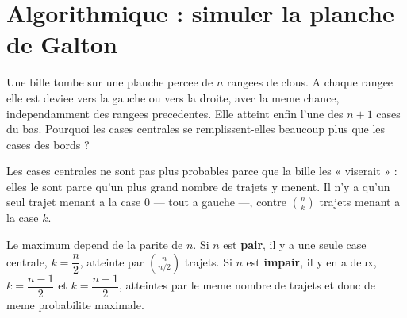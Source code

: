 
\section{Algorithmique : simuler la planche de Galton}



Une bille tombe sur une planche percee de $n$ rangees de clous. A chaque
rangee elle est deviee vers la gauche ou vers la droite, avec la meme chance,
independamment des rangees precedentes. Elle atteint enfin l'une des $n+1$
cases du bas. Pourquoi les cases centrales se remplissent-elles beaucoup plus
que les cases des bords ?



Les cases centrales ne sont pas plus probables parce que la bille les
« viserait » : elles le sont parce qu'un plus grand nombre de trajets y
menent. Il n'y a qu'un seul trajet menant a la case $0$ --- tout a gauche ---,
contre $\binom{n}{k}$ trajets menant a la case $k$.

Le maximum depend de la parite de $n$. Si $n$ est \textbf{pair}, il y a une
seule case centrale, $k = \dfrac{n}{2}$, atteinte par $\binom{n}{n/2}$ trajets.
Si $n$ est \textbf{impair}, il y en a deux, $k = \dfrac{n-1}{2}$ et
$k = \dfrac{n+1}{2}$, atteintes par le meme nombre de trajets et donc de meme
probabilite maximale.

